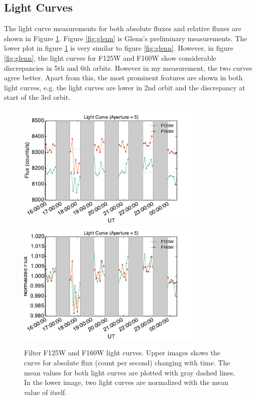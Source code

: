 \documentclass[paper=letter, fontsize=11pt]{scrartcl} %
\numberwithin{equation}{section} %
\numberwithin{figure}{section} %
\numberwithin{table}{section} %
\begin{document}
\subsection{Light Curves}

The light curve measurements for both absolute fluxes and relative
fluxes are shown in Figure \ref{fig:lightcurve}. Figure
\ref{fig:glenn} is Glenn's preliminary measurements. The lower plot in
figure \ref{fig:lightcurve} is very similar to figure
\ref{fig:glenn}. However, in figure \ref{fig:glenn}, the light curves
for F125W and F160W show considerable discrepancies in 5th and 6th
orbits. However in my measurement, the two curves agree better. Apart
from this, the most prominent features are shown in both light
curves, e.g. the light curves are lower in 2nd orbit and the
discrepancy at start of the 3rd orbit.

\begin{figure}
  \centering
  \includegraphics[width=0.8\textwidth]{fluxcurve_aper_05}
  \includegraphics[width=0.8\textwidth]{relativefluxcurve_aper_05}
  \caption{Filter F125W and F160W light curves. Upper images shows the
    curve for absolute flux (count per second) changing with time. The
    mean values for both light curves are plotted with gray dashed
    lines. In the lower image, two light curves are normalized with
    the mean value of itself.}
  \label{fig:lightcurve}
\end{figure}
\end{document}
